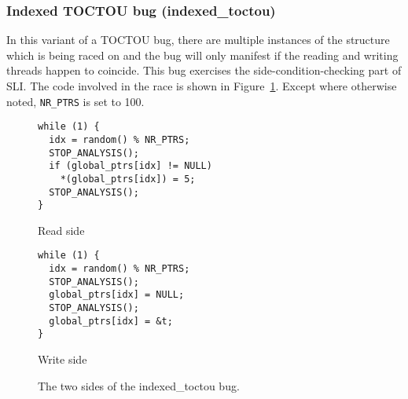 




\subsubsection{Indexed TOCTOU bug (indexed\_toctou)}
\label{sect:eval:indexed_toctou}

In this variant of a TOCTOU bug, there are multiple instances of the
structure which is being raced on and the bug will only manifest if
the reading and writing threads happen to coincide.  This bug
exercises the side-condition-checking part of SLI.  The code involved
in the race is shown in Figure~\ref{fig:eval:indexed_toctou}.  Except
where otherwise noted, \verb|NR_PTRS| is set to 100.

\begin{figure}
  \begin{subfloat}
    \begin{minipage}{70mm}
\begin{verbatim}
while (1) {
  idx = random() % NR_PTRS;
  STOP_ANALYSIS();
  if (global_ptrs[idx] != NULL)
    *(global_ptrs[idx]) = 5;
  STOP_ANALYSIS();
}
\end{verbatim}
    \end{minipage}
    \caption{Read side}
  \end{subfloat}
  \begin{subfloat}
    \begin{minipage}{70mm}
\begin{verbatim}
while (1) {
  idx = random() % NR_PTRS;
  STOP_ANALYSIS();
  global_ptrs[idx] = NULL;
  STOP_ANALYSIS();
  global_ptrs[idx] = &t;
}
\end{verbatim}
    \end{minipage}
    \caption{Write side}
  \end{subfloat}
  \caption{The two sides of the indexed\_toctou bug.}
  \label{fig:eval:indexed_toctou}
\end{figure}

